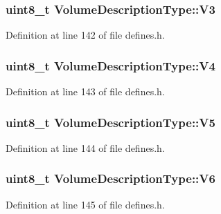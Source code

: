 \subsubsection[{\texorpdfstring{V3}{V3}}]{\setlength{\rightskip}{0pt plus 5cm}uint8\+\_\+t Volume\+Description\+Type\+::\+V3}\hypertarget{structVolumeDescriptionType_a2a6a98d42bff4b72a02f562f1be113d2}{}\label{structVolumeDescriptionType_a2a6a98d42bff4b72a02f562f1be113d2}


Definition at line 142 of file defines.\+h.

\subsubsection[{\texorpdfstring{V4}{V4}}]{\setlength{\rightskip}{0pt plus 5cm}uint8\+\_\+t Volume\+Description\+Type\+::\+V4}\hypertarget{structVolumeDescriptionType_ad10e9650afd43567c2b3b709d72f5dec}{}\label{structVolumeDescriptionType_ad10e9650afd43567c2b3b709d72f5dec}


Definition at line 143 of file defines.\+h.

\subsubsection[{\texorpdfstring{V5}{V5}}]{\setlength{\rightskip}{0pt plus 5cm}uint8\+\_\+t Volume\+Description\+Type\+::\+V5}\hypertarget{structVolumeDescriptionType_a986e346428396e0c131a9f200f472716}{}\label{structVolumeDescriptionType_a986e346428396e0c131a9f200f472716}


Definition at line 144 of file defines.\+h.

\subsubsection[{\texorpdfstring{V6}{V6}}]{\setlength{\rightskip}{0pt plus 5cm}uint8\+\_\+t Volume\+Description\+Type\+::\+V6}\hypertarget{structVolumeDescriptionType_a3f925228651ced5c0e7c373ec6573162}{}\label{structVolumeDescriptionType_a3f925228651ced5c0e7c373ec6573162}


Definition at line 145 of file defines.\+h.

